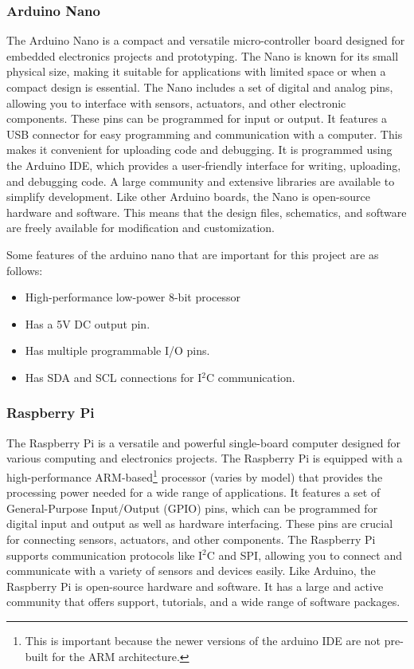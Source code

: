 \documentclass{article}
\begin{document}
\begin{multicols}{2}
			\subsubsection{Arduino Nano}
			
			The Arduino Nano is a compact and versatile micro-controller board designed for embedded electronics projects and prototyping. The Nano is known for its small physical size, making it suitable for applications with limited space or when a compact design is essential. The Nano includes a set of digital and analog pins, allowing you to interface with sensors, actuators, and other electronic components. These pins can be programmed for input or output. It features a USB connector for easy programming and communication with a computer. This makes it convenient for uploading code and debugging. It is programmed using the Arduino IDE, which provides a user-friendly interface for writing, uploading, and debugging code. A large community and extensive libraries are available to simplify development. Like other Arduino boards, the Nano is open-source hardware and software. This means that the design files, schematics, and software are freely available for modification and customization.
			
			Some features of the arduino nano that are important for this project are as follows:
			\begin{itemize}[itemsep=1pt, parsep=1pt]
				\item High-performance low-power 8-bit processor
				\item Has a 5V DC output pin.
				\item Has multiple programmable I/O pins.
				\item Has SDA and SCL connections for I$^2$C communication.
			\end{itemize}
		
			\subsubsection{Raspberry Pi}
			
			The Raspberry Pi is a versatile and powerful single-board computer designed for various computing and electronics projects. The Raspberry Pi is equipped with a high-performance ARM-based\footnote{This is important because the newer versions of the arduino IDE are not pre-built for the ARM architecture.} processor (varies by model) that provides the processing power needed for a wide range of applications. It features a set of General-Purpose Input/Output (GPIO) pins, which can be programmed for digital input and output as well as hardware interfacing. These pins are crucial for connecting sensors, actuators, and other components. The Raspberry Pi supports communication protocols like I$^2$C and SPI, allowing you to connect and communicate with a variety of sensors and devices easily. Like Arduino, the Raspberry Pi is open-source hardware and software. It has a large and active community that offers support, tutorials, and a wide range of software packages.
			

\end{multicols}
\end{document}
